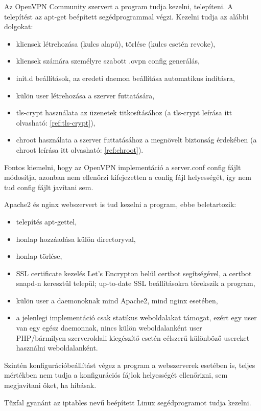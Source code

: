 Az OpenVPN Community szervert a program tudja kezelni, telepíteni. A telepítést az apt-get beépített segédprogrammal végzi. Kezelni tudja az alábbi dolgokat:
\begin{itemize}
	\item kliensek létrehozása (kulcs alapú), törlése (kulcs esetén revoke),
	\item kliensek számára személyre szabott .ovpn config generálás,
	\item init.d beállítások, az eredeti daemon beállítása automatikus indításra,
	\item külön user létrehozása a szerver futtatására,
	\item tls-crypt használata az üzenetek titkosításához (a tls-crypt leírása itt olvasható: \ref{ref:tls-crypt}),
	\item chroot használata a szerver futtatásához a megnövelt biztonság érdekében (a chroot leírása itt olvasható: \ref{ref:chroot}).
\end{itemize}
Fontos kiemelni, hogy az OpenVPN implementáció a server.conf config fájlt módosítja, azonban nem ellenőrzi kifejezetten a config fájl helyességét, így nem tud config fájlt javítani sem.

Apache2 és nginx webszervert is tud kezelni a program, ebbe beletartozik:
\begin{itemize}
	\item telepítés apt-gettel,
	\item honlap hozzáadása külön directoryval,
	\item honlap törlése,
	\item SSL certificate kezelés Let's Encrypton belül certbot segítségével, a certbot snapd-n keresztül települ; up-to-date SSL beállításokra törekszik a program,
	\item külön user a daemonoknak mind Apache2, mind nginx esetében,
	\item a jelenlegi implementáció csak statikus weboldalakat támogat, ezért egy user van egy egész daemonnak, nincs külön weboldalanként user\\PHP/bármilyen szerveroldali kiegészítő esetén célszerű különböző usereket használni weboldalanként.
\end{itemize}

Szintén konfigurációbeállítást végez a program a webszerverek esetében is, teljes mértékben nem tudja a konfigurációs fájlok helyességét ellenőrizni, sem megjavítani őket, ha hibásak.

Tűzfal gyanánt az iptables nevű beépített Linux segédprogramot tudja kezelni.

